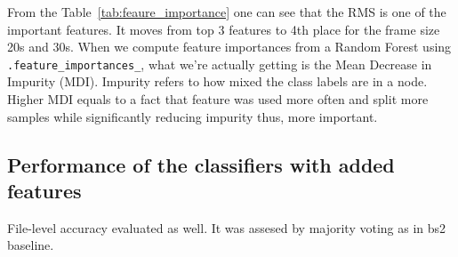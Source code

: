 \documentclass[conference]{IEEEtran}
\begin{document}
From the Table~\ref{tab:feaure_importance} one can see that the RMS is one of the important features. 
It moves from top 3 features to 4th place for the frame size 20s and 30s.
When we compute feature importances from a Random Forest using \texttt{.feature\_importances\_}, what we're actually getting is the Mean Decrease in Impurity (MDI). 
Impurity refers to how mixed the class labels are in a node.
Higher MDI equals to a fact that feature was used more often and split more samples while significantly reducing impurity thus, 
more important.


\subsection{Performance of the classifiers with added features}


\begin{table}[h]
\centering
\caption{Linear model performance with added features.}
\label{tab:linear_model_added_feat_perf}
\end{table}


File-level accuracy evaluated as well. It was assesed by majority voting as in bs2 baseline.
\end{document}
